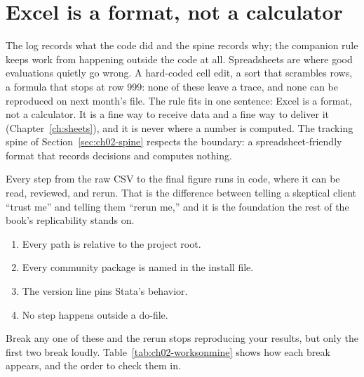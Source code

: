 \section{Excel is a format, not a calculator}\label{sec:ch02-excel}
The log records what the code did and the spine records why; the companion rule keeps work from happening outside the code at all. Spreadsheets are where good evaluations quietly go wrong. A hard-coded cell edit, a sort that scrambles rows, a formula that stops at row 999: none of these leave a trace, and none can be reproduced on next month's file. The rule fits in one sentence: Excel is a format, not a calculator. It is a fine way to receive data and a fine way to deliver it (Chapter~\ref{ch:sheets}), and it is never where a number is computed. The tracking spine of Section~\ref{sec:ch02-spine} respects the boundary: a spreadsheet-friendly format that records decisions and computes nothing.

Every step from the raw CSV to the final figure runs in code, where it can be read, reviewed, and rerun. That is the difference between telling a skeptical client \enquote{trust me} and telling them \enquote{rerun me,} and it is the foundation the rest of the book's replicability stands on.

\begin{restson}
\begin{enumerate}
\item Every path is relative to the project root.
\item Every community package is named in the install file.
\item The version line pins Stata's behavior.
\item No step happens outside a do-file.
\end{enumerate}
Break any one of these and the rerun stops reproducing your results, but only the first two break loudly. Table~\ref{tab:ch02-worksonmine} shows how each break appears, and the order to check them in.
\end{restson}


